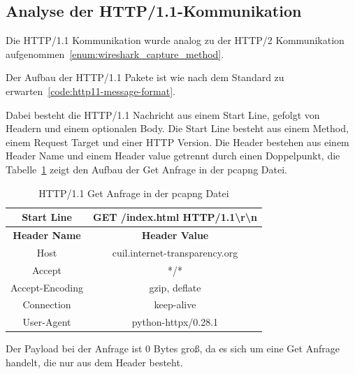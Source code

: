 \FloatBarrier
\subsection{Analyse der HTTP/1.1-Kommunikation}

Die HTTP/1.1 Kommunikation wurde analog zu der HTTP/2 Kommunikation aufgenommen~\ref{enum:wireshark_capture_method}.

Der Aufbau der HTTP/1.1 Pakete ist wie nach dem Standard zu erwarten~\ref{code:http11-message-format}.


Dabei besteht die HTTP/1.1 Nachricht aus einem Start Line, gefolgt von Headern und einem optionalen Body.
Die Start Line besteht aus einem Method, einem Request Target und einer HTTP Version.
Die Header bestehen aus einem Header Name und einem Header value getrennt durch einen Doppelpunkt, die Tabelle~\ref{tab:http11-header-request} zeigt den Aufbau der Get Anfrage in der pcapng Datei.

\begin{table}[h]
    \centering
    \begin{tabular}{|c|c|}
        \hline
        \textbf{Start Line} & GET /index.html HTTP/1.1\textbackslash r\textbackslash n \\
        \hline
        \textbf{Header Name} & \textbf{Header Value} \\
        \hline
        Host & cuil.internet-transparency.org \\
        Accept & */* \\
        Accept-Encoding & gzip, deflate \\
        Connection & keep-alive \\
        User-Agent & python-httpx/0.28.1 \\
        \hline
    \end{tabular}
    \caption{HTTP/1.1 Get Anfrage in der pcapng Datei}\label{tab:http11-header-request}
\end{table}

Der Payload bei der Anfrage ist 0 Bytes groß, da es sich um eine Get Anfrage handelt, die nur aus dem Header besteht.

